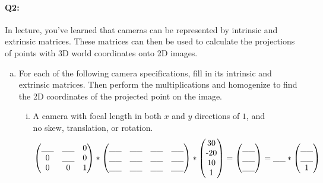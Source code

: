 \paragraph{Q2:} In lecture, you've learned that cameras can be represented by intrinsic and extrinsic matrices. These matrices can then be used to calculate the projections of points with 3D world coordinates onto 2D images. 
\begin{enumerate} [(a)]
\item For each of the following camera specifications, fill in its intrinsic and extrinsic matrices. Then perform the multiplications and homogenize to find the 2D coordinates of the projected point on the image.
\begin{enumerate} [(i)]

\item A camera with focal length in both $x$ and $y$ directions of $1$, and\\
no skew, translation, or rotation.
\vspace{-0.3cm}
\begin{align}
    \begin{pmatrix} 
    \_\_ & \_\_ & $0$ \\ 
    $0$ & \_\_ & $0$ \\ 
    $0$ & $0$ & $1$ \end{pmatrix} *
    \begin{pmatrix} 
    \_\_ & \_\_ & \_\_ & \_\_ \\ 
    \_\_ & \_\_ & \_\_ & \_\_ \\ 
    \_\_ & \_\_ & \_\_ & \_\_ \end{pmatrix} * 
    \begin{pmatrix} 
    $30$ \\ 
    $-20$ \\ 
    $10$ \\ 
    $1$ \end{pmatrix}
    = \begin{pmatrix}  \_\_ \\ \_\_ \\ \_\_ \end{pmatrix}
    = \_\_ * \begin{pmatrix}  \_\_ \\ \_\_ \\ $1$ \end{pmatrix}
\end{align}


\end{enumerate}
\end{enumerate}
